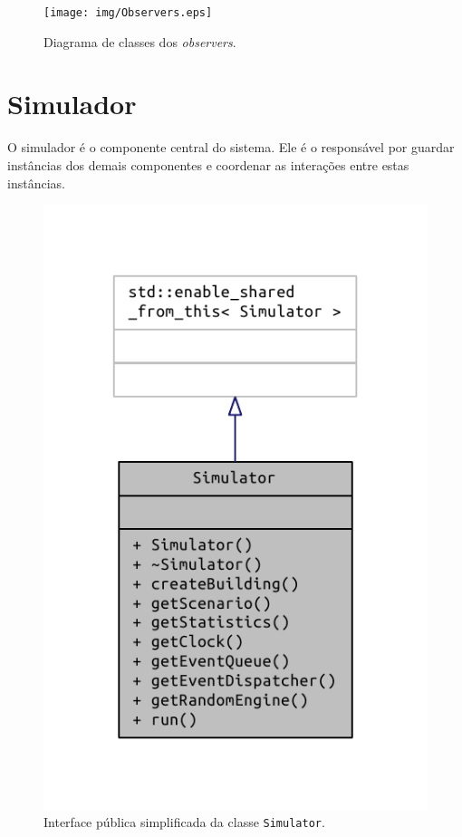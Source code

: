 \begin{figure}[htb!]
  \centering
  \texttt{[image: img/Observers.eps]}
  \caption{Diagrama de classes dos \textit{observers}.}
\label{fig:diagram:observers}
\end{figure}

\section{\label{model:simulator}Simulador}

O simulador é o componente central do sistema. Ele é o responsável por guardar
instâncias dos demais componentes e coordenar as interações entre estas
instâncias.

\begin{figure}[htb!]
  \centering
  \includegraphics{doc/latex/class_simulator__coll__graph}
  \caption{Interface pública simplificada da classe \texttt{Simulator}.}
\label{fig:diagram:simulator}
\end{figure}

